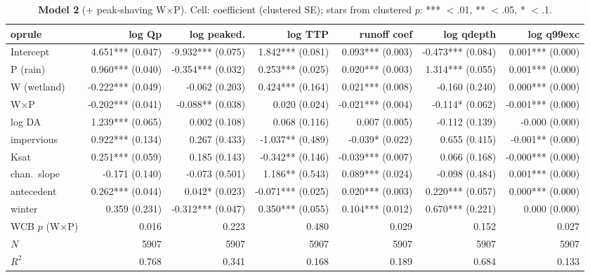 \documentclass[10pt]{article}
\begin{document}
\begin{landscape}\begin{table}[htbp]\centering
\caption{\textbf{Model 2} (+ peak-shaving W$\times$P). Cell: coefficient (clustered SE); stars from clustered $p$: *** $<$.01, ** $<$.05, * $<$.1.}
\scriptsize\begin{tabular}{lrrrrrr}	oprule
 & \textbf{log Qp} & \textbf{log peaked.} & \textbf{log TTP} & \textbf{runoff coef} & \textbf{log qdepth} & \textbf{log q99exc} \\ \midrule
Intercept & 4.651*** (0.047) & -9.932*** (0.075) & 1.842*** (0.081) & 0.093*** (0.003) & -0.473*** (0.084) & 0.001*** (0.000) \\
P (rain) & 0.960*** (0.040) & -0.354*** (0.032) & 0.253*** (0.025) & 0.020*** (0.003) & 1.314*** (0.055) & 0.001*** (0.000) \\
W (wetland) & -0.222*** (0.049) & -0.062 (0.203) & 0.424*** (0.164) & 0.021*** (0.008) & -0.160 (0.240) & 0.000*** (0.000) \\
W$\times$P & -0.202*** (0.041) & -0.088** (0.038) & 0.020 (0.024) & -0.021*** (0.004) & -0.114* (0.062) & -0.001*** (0.000) \\
log DA & 1.239*** (0.065) & 0.002 (0.108) & 0.068 (0.116) & 0.007 (0.005) & -0.112 (0.139) & -0.000 (0.000) \\
impervious & 0.922*** (0.134) & 0.267 (0.433) & -1.037** (0.489) & -0.039* (0.022) & 0.655 (0.415) & -0.001** (0.000) \\
Ksat & 0.251*** (0.059) & 0.185 (0.143) & -0.342** (0.146) & -0.039*** (0.007) & 0.066 (0.168) & -0.000*** (0.000) \\
chan.\ slope & -0.171 (0.140) & -0.073 (0.501) & 1.186** (0.543) & 0.089*** (0.024) & -0.098 (0.484) & 0.001*** (0.000) \\
antecedent & 0.262*** (0.044) & 0.042* (0.023) & -0.071*** (0.025) & 0.020*** (0.003) & 0.220*** (0.057) & 0.000*** (0.000) \\
winter & 0.359 (0.231) & -0.312*** (0.047) & 0.350*** (0.055) & 0.104*** (0.012) & 0.670*** (0.221) & 0.000 (0.000) \\
\midrule
WCB $p$ (W$\times$P) & 0.016 & 0.223 & 0.480 & 0.029 & 0.152 & 0.027 \\
$N$ & 5907 & 5907 & 5907 & 5907 & 5907 & 5907 \\
$R^2$ & 0.768 & 0.341 & 0.168 & 0.189 & 0.684 & 0.133 \\
\bottomrule\end{tabular}
\end{table}\end{landscape}
\end{document}
